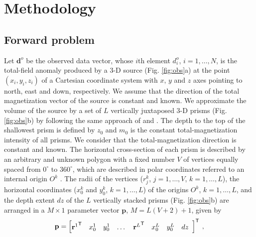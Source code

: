 \section{Methodology}\label{sec:metodo}

\subsection{Forward problem}

Let $\mathbf{d}^{o}$ be the observed data vector, whose $i$th element $d^{o}_{i}$, $i = 1, \dots, N$, is the total-field 
anomaly produced by a 3-D source (Fig. \ref{fig:obs}a) at the point $(x_{i}, y_{i}, z_{i})$ of a Cartesian coordinate 
system with $x$, $y$ and $z$ axes pointing to north, east and down, respectively. We assume that the direction of the 
total magnetization vector of the source is constant and known. 
We approximate the volume of the source by a set of $L$ vertically juxtaposed 3-D prisms 
(Fig. \ref{fig:obs}b) by following the same approach of \citet{oliveirajr-etal2011} and \citet{oliveirajr-barbosa2013}. 
The depth to the top of the shallowest prism is defined by $z_{0}$ and $m_{0}$ is the constant total-magnetization 
intensity of all prisms. We consider that the total-magnetization direction is constant and known.
The horizontal cross-section of each prism is described by an arbitrary and unknown polygon with a fixed number 
$V$ of vertices equally spaced from $0^{\circ}$ to $360^{\circ}$, which are described in polar coordinates 
referred to an internal origin $O^{k}$ . 
The radii of the vertices ($r^{k}_{j}$, $j=1,\dots , V$, $k=1,\dots ,L$), the horizontal coordinates ($x_{0}^{k}$ and $y_{0}^{k}$, $k=1,\dots ,L$) 
of the origins $O^{k}$, $k=1,\dots ,L$, and the depth extent $dz$ of the $L$ vertically stacked prisms (Fig. \ref{fig:obs}b) are arranged in a 
$M \times 1$ parameter vector $\mathbf{p}$, $M = L (V + 2) + 1$, given by
\begin{equation}
\mathbf{p} = \left[ \begin{array}{@{}*{12}{c}@{}}
{\mathbf{r}^{1}}^{\mathsf{T}} & x_{0}^{1} & y_{0}^{1} & \dots & {\mathbf{r}^{L}}^{\mathsf{T}} & x_{0}^{L} & y_{0}^{L} & dz \\
\end{array} \right]^{\mathsf{T}} \: ,
\label{eq:p-vector}
\end{equation}
